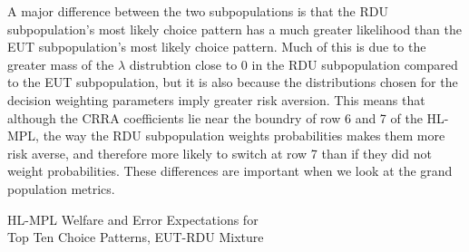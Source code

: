 \documentclass[../main.tex]{subfiles}
\begin{document}
A major difference between the two subpopulations is that the RDU subpopulation's most likely choice pattern has a much greater likelihood than the EUT subpopulation's most likely choice pattern.
Much of this is due to the greater mass of the $\lambda$ distrubtion close to $0$ in the RDU subpopulation compared to the EUT subpopulation, but it is also because the distributions chosen for the decision weighting parameters imply greater risk aversion.
This means that although the CRRA coefficients lie near the boundry of row 6 and 7 of the HL-MPL, the way the RDU subpopulation weights probabilities makes them more risk averse, and therefore more likely to switch at row 7 than if they did not weight probabilities.
These differences are important when we look at the grand population metrics.

\begin{table}[ht]
	\centering
	\caption{HL-MPL Welfare and Error Expectations for\\Top Ten Choice Patterns, EUT-RDU Mixture}
	\label{tb:TopTenMIX}
	\begin{adjustbox}{width=1\textwidth}
	\end{adjustbox}
\end{table}
\end{document}
